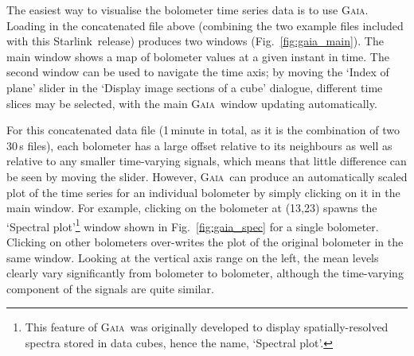 \documentclass[twoside,11pt]{article}
\newcommand{\htmladdnormallink}[2]{#1}
\newcommand{\xref}[3]{#1}
\renewcommand{\_}{\texttt{\symbol{95}}}
\newcommand{\starlink}{\htmladdnormallink{Starlink}{http://starlink.jach.hawaii.edu}}
\newcommand{\gaia}{\xref{\textsc{Gaia}}{sun214}{}}
\begin{document}
The easiest way to visualise the bolometer time series data is to use
\gaia. Loading in the concatenated file above (combining the two
example files included with this \starlink\ release) produces two
windows (Fig.~\ref{fig:gaia_main}). The main window shows a map of
bolometer values at a given instant in time. The second window can be
used to navigate the time axis; by moving the `Index of plane' slider
in the `Display image sections of a cube' dialogue, different time
slices may be selected, with the main \gaia\ window updating
automatically.

For this concatenated data file (1\,minute in total, as it is the
combination of two 30\,s files), each bolometer has a large offset
relative to its neighbours as well as relative to any smaller
time-varying signals, which means that little difference can be seen
by moving the slider. However, \gaia\ can produce an automatically
scaled plot of the time series for an individual bolometer by simply
clicking on it in the main window. For example, clicking on the
bolometer at (13,23) spawns the `Spectral plot'\footnote{This feature
  of \gaia\ was originally developed to display spatially-resolved
  spectra stored in data cubes, hence the name, `Spectral plot'.}
window shown in Fig.~\ref{fig:gaia_spec} for a single
bolometer. Clicking on other bolometers over-writes the plot of the
original bolometer in the same window. Looking at the vertical axis
range on the left, the mean levels clearly vary significantly from
bolometer to bolometer, although the time-varying component of the
signals are quite similar.
\end{document}
